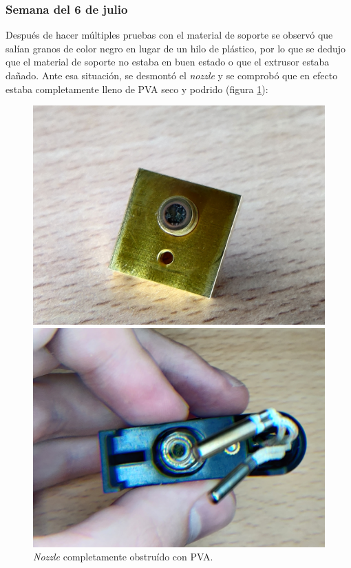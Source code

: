 \subsubsection*{Semana del 6 de julio}
Después de hacer múltiples pruebas con el material de soporte se observó que salían granos de
color negro en lugar de un hilo de plástico, por lo que se dedujo que el material de
soporte no estaba en buen estado o que el extrusor estaba dañado. Ante esa situación,
se desmontó el \textit{nozzle} y se comprobó que en efecto estaba completamente lleno
de \ac{PVA} seco y podrido (figura \ref{fig:nozzle_oof}):

\begin{figure}[H]
    \centering
    \begin{minipage}{.49\linewidth}
        \includegraphics[width=\linewidth]{pictures/clogged_nozzle.jpg}
    \end{minipage}
    \hfill
    \begin{minipage}{.49\linewidth}
        \includegraphics[width=\linewidth]{pictures/nozzle_oof_2.jpg}
    \end{minipage}
    \caption{\textit{Nozzle} completamente obstruído con \ac{PVA}.}        
    \label{fig:nozzle_oof}
\end{figure}

